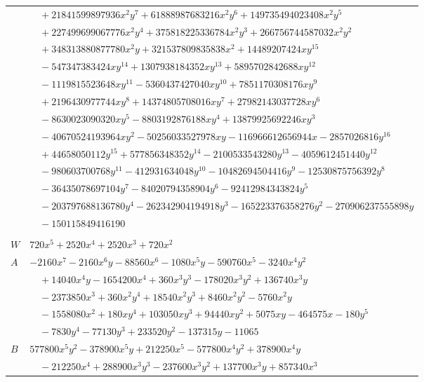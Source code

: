 \documentclass[11pt]{article}
\begin{document}
\begin{longtable}{@{}ll@{}}
 & $\quad +21841599897936x^{2}y^{7}+61888987683216x^{2}y^{6}+149735494023408x^{2}y^{5}$\\
 & $\quad +227499699067776x^{2}y^{4}+375818225336784x^{2}y^{3}+266756744587032x^{2}y^{2}$\\
 & $\quad +348313880877780x^{2}y+321537809835838x^{2}+14489207424xy^{15}$\\
 & $\quad -547347383424xy^{14}+1307938184352xy^{13}+5895702842688xy^{12}$\\
 & $\quad -1119815523648xy^{11}-5360437427040xy^{10}+7851170308176xy^{9}$\\
 & $\quad +2196430977744xy^{8}+14374805708016xy^{7}+27982143037728xy^{6}$\\
 & $\quad -8630023090320xy^{5}-8803192876188xy^{4}+13879925692246xy^{3}$\\
 & $\quad -40670524193964xy^{2}-50256033527978xy-116966612656944x-2857026816y^{16}$\\
 & $\quad +44658050112y^{15}+577856348352y^{14}-2100533543280y^{13}-4059612451440y^{12}$\\
 & $\quad -980603700768y^{11}-412931634048y^{10}-10482694504416y^{9}-12530875756392y^{8}$\\
 & $\quad -36435078697104y^{7}-84020794358904y^{6}-92412984343824y^{5}$\\
 & $\quad -203797688136780y^{4}-262342904194918y^{3}-165223376358276y^{2}-270906237555898y$\\
 & $\quad -150115849416190$\\
\addlinespace[3pt]
\multicolumn{2}{@{}l}{$i=59$, $m=18$, neighbours $117,7,31,63,71,75,103$}\\
$W$ & $720x^{5}+2520x^{4}+2520x^{3}+720x^{2}$\\
$A$ & $-2160x^{7}-2160x^{6}y-88560x^{6}-1080x^{5}y-590760x^{5}-3240x^{4}y^{2}$\\
 & $\quad +14040x^{4}y-1654200x^{4}+360x^{3}y^{3}-178020x^{3}y^{2}+136740x^{3}y$\\
 & $\quad -2373850x^{3}+360x^{2}y^{4}+18540x^{2}y^{3}+8460x^{2}y^{2}-5760x^{2}y$\\
 & $\quad -1558080x^{2}+180xy^{4}+103050xy^{3}+94440xy^{2}+5075xy-464575x-180y^{5}$\\
 & $\quad -7830y^{4}-77130y^{3}+233520y^{2}-137315y-11065$\\
$B$ & $577800x^{5}y^{2}-378900x^{5}y+212250x^{5}-577800x^{4}y^{2}+378900x^{4}y$\\
 & $\quad -212250x^{4}+288900x^{3}y^{3}-237600x^{3}y^{2}+137700x^{3}y+857340x^{3}$\\

\end{longtable}
\end{document}
